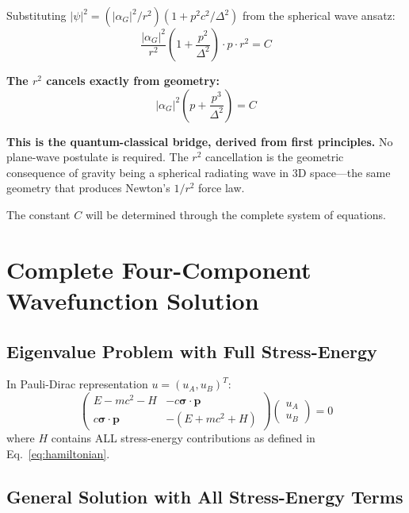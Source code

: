 \documentclass[11pt,a4paper]{article}
\theoremstyle{definition}
\theoremstyle{remark}
\begin{document}
	Substituting $|\psi|^2 = (|\alpha_G|^2/r^2)(1 + p^2c^2/\Delta^2)$ from the spherical wave ansatz:
	\begin{equation}
		\frac{|\alpha_G|^2}{r^2}\!\left(1 + \frac{p^2}{\Delta^2}\right)\cdot p \cdot r^2 = C
	\end{equation}
	
	\textbf{The $r^2$ cancels exactly from geometry:}
	\begin{equation}
		\boxed{|\alpha_G|^2\!\left(p + \frac{p^3}{\Delta^2}\right) = C}
		\label{eq:cubic_from_geometry}
	\end{equation}
	
	\textbf{This is the quantum-classical bridge, derived from first principles.}  No plane-wave postulate is required.  The $r^2$ cancellation is the geometric consequence of gravity being a spherical radiating wave in 3D space---the same geometry that produces Newton's $1/r^2$ force law.
	
	The constant $C$ will be determined through the complete system of equations.
	
	\section{Complete Four-Component Wavefunction Solution}
	
	\subsection{Eigenvalue Problem with Full Stress-Energy}
	
	In Pauli-Dirac representation $u=(u_A,u_B)^T$:
	\begin{equation}
		\begin{pmatrix} E-mc^2-H & -c\boldsymbol{\sigma}\cdot\mathbf{p} \\ c\boldsymbol{\sigma}\cdot\mathbf{p} & -(E+mc^2+H) \end{pmatrix}
		\begin{pmatrix} u_A \\ u_B \end{pmatrix} = 0
		\label{eq:coupled_system}
	\end{equation}
	where $H$ contains ALL stress-energy contributions as defined in Eq.~\eqref{eq:hamiltonian}.
	
	\subsection{General Solution with All Stress-Energy Terms}
	
\end{document}
